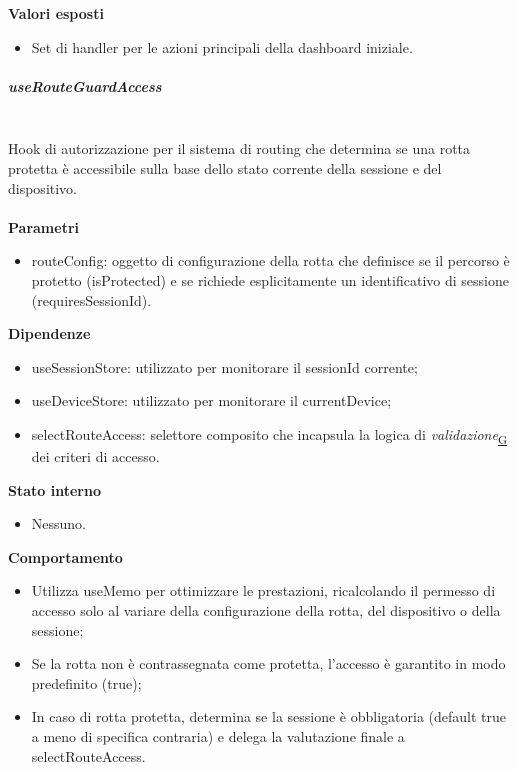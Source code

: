 \documentclass[a4paper,12pt]{article}
\begin{document}
                \textbf{Valori esposti}
                \begin{itemize}
                    \item Set di handler per le azioni principali della dashboard iniziale.
                \end{itemize}
                
                \subparagraph{useRouteGuardAccess}\mbox{}\\
                Hook di autorizzazione per il sistema di routing che determina se una rotta protetta è accessibile sulla base dello stato corrente della sessione e del dispositivo.\\\\
                \textbf{Parametri}
                \begin{itemize}
                    \item {\ttfamily routeConfig}: oggetto di configurazione della rotta che definisce se il percorso è protetto ({\ttfamily isProtected}) e se richiede esplicitamente un identificativo di sessione ({\ttfamily requiresSessionId}).
                \end{itemize}
                \textbf{Dipendenze}
                \begin{itemize}
                    \item {\ttfamily useSessionStore}: utilizzato per monitorare il {\ttfamily sessionId} corrente;
                    \item {\ttfamily useDeviceStore}: utilizzato per monitorare il {\ttfamily currentDevice};
                    \item {\ttfamily selectRouteAccess}: selettore composito che incapsula la logica di \textit{validazione}\textsubscript{\href{https://atlasteam9.github.io/Atlas/glossario.html\#Validazione}{G}} dei criteri di accesso.
                \end{itemize}
                \textbf{Stato interno}
                \begin{itemize}
                    \item Nessuno.
                \end{itemize}
                \textbf{Comportamento}
                \begin{itemize}
                    \item Utilizza {\ttfamily useMemo} per ottimizzare le prestazioni, ricalcolando il permesso di accesso solo al variare della configurazione della rotta, del dispositivo o della sessione;
                    \item Se la rotta non è contrassegnata come protetta, l'accesso è garantito in modo predefinito ({\ttfamily true});
                    \item In caso di rotta protetta, determina se la sessione è obbligatoria (default {\ttfamily true} a meno di specifica contraria) e delega la valutazione finale a {\ttfamily selectRouteAccess}.
                \end{itemize}
\end{document}
